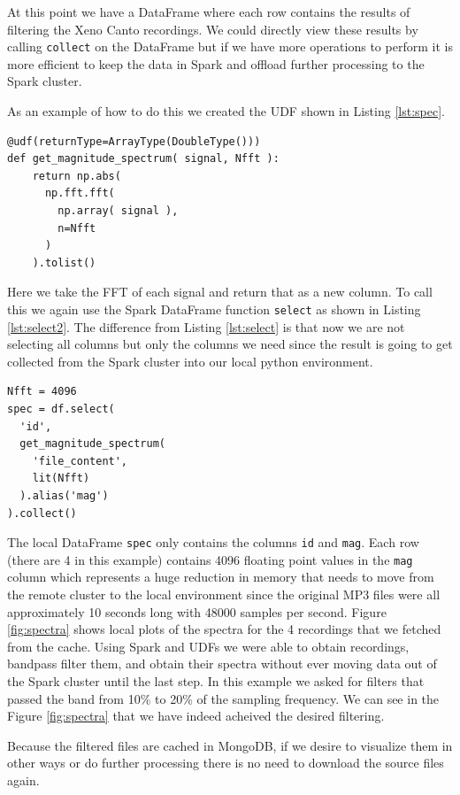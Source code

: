 \documentclass[conference,twoside]{IEEEtran}
\newcommand{\code}[1]{\texttt{#1}}
\begin{document}
At this point we have a DataFrame where each row contains the results of filtering the Xeno Canto recordings. We could directly view these results by calling \code{collect} on the DataFrame but if we have more operations to perform it is more efficient to keep the data in Spark and offload further processing to the Spark cluster.

As an example of how to do this we created the UDF shown in Listing \ref{lst:spec}.
\begin{lstlisting}[language=Txt, caption={Taking FFTs with Spark}, label={lst:spec}]
@udf(returnType=ArrayType(DoubleType()))
def get_magnitude_spectrum( signal, Nfft ):
    return np.abs(
      np.fft.fft(
        np.array( signal ),
        n=Nfft
      )
    ).tolist()
\end{lstlisting}
Here we take the FFT of each signal and return that as a new column. To call this we again use the Spark DataFrame function \code{select} as shown in Listing \ref{lst:select2}. The difference from Listing \ref{lst:select} is that now we are not selecting all columns but only the columns we need since the result is going to get collected from the Spark cluster into our local python environment.
\begin{lstlisting}[language=Txt, caption={Collecting UDF Results for Local Processing}, label={lst:select2}]
Nfft = 4096
spec = df.select(
  'id',
  get_magnitude_spectrum(
    'file_content',
    lit(Nfft)
  ).alias('mag')
).collect()
\end{lstlisting}
The local DataFrame \code{spec} only contains the columns \code{id} and \code{mag}. Each row (there are 4 in this example) contains 4096 floating point values in the \code{mag} column which represents a huge reduction in memory that needs to move from the remote cluster to the local environment since the original MP3 files were all approximately 10 seconds long with 48000 samples per second. Figure \ref{fig:spectra} shows local plots of the spectra for the 4 recordings that we fetched from the cache. Using Spark and UDFs we were able to obtain recordings, bandpass filter them, and obtain their spectra without ever moving data out of the Spark cluster until the last step. In this example we asked for filters that passed the band from 10\% to 20\% of the sampling frequency. We can see in the Figure \ref{fig:spectra} that we have indeed acheived the desired filtering.

Because the filtered files are cached in MongoDB, if we desire to visualize them in other ways or do further processing there is no need to download the source files again.
\end{document}
